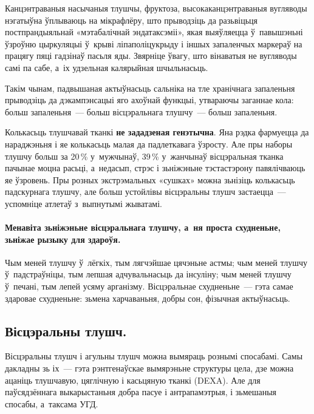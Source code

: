 
Канцэнтраваныя насычаныя тлушчы, фруктоза, высокаканцэнтраваныя вугляводы нэгатыўна ўплываюць на мікрафлёру, што прыводзіць да разьвіцьця постпрандыяльнай «мэтабалічнай эндатаксэміі», якая выяўляецца ў~павышэньні ўзроўню цыркуляцыі ў~крыві ліпаполіцукрыду і іншых запаленчых маркераў на працягу пяці гадзінаў пасьля яды. Звярніце ўвагу, што вінаватыя не вугляводы самі па сабе, а~іх удзельная калярыйная шчыльнасьць.

Такім чынам, падвышаная актыўнасьць сальніка на тле хранічнага запаленьня прыводзіць да дэкампэнсацыі яго ахоўнай функцыі, утвараючы заганнае кола: больш запаленьня~--- больш вісцэральнага тлушчу~--- больш запаленьня.

Колькасьць тлушчавай тканкі \textbf{не зададзеная генэтычна}. Яна рэдка фармуецца да нараджэньня і яе колькасьць малая да падлеткавага ўзросту. Але пры наборы тлушчу больш за 20\,\% у~мужчынаў, 39\,\% у~жанчынаў вісцэральная тканка пачынае моцна расьці, а~недасып, стрэс і зьніжэньне тэстастэрону павялічваюць яе ўзровень. Пры розных экстрэмальных «сушках» можна зьнізіць колькасьць падскурнага тлушчу, але больш устойлівы вісцэральны тлушч застаецца~--- успомніце атлетаў з~выпнутымі жыватамі.

\paragraph{Менавіта зьніжэньне вісцэральнага тлушчу, а~ня проста схудненьне, зьніжае рызыку для здароўя.} Чым меней тлушчу ў~лёгкіх, тым лягчэйшае цячэньне астмы; чым меней тлушчу ў~падстраўніцы, тым лепшая адчувальнасьць да інсуліну; чым меней тлушчу ў~печані, тым лепей усяму арганізму. Вісцэральнае схудненьне~--- гэта самае здаровае схудненьне: зьмена харчаваньня, добры сон, фізычная актыўнасьць.

\subsection*{Вісцэральны тлушч.}
Вісцэральны тлушч і агульны тлушч можна вымяраць рознымі спосабамі. Самы дакладны зь іх~--- гэта рэнтгенаўскае вымярэньне структуры цела, дзе можна ацаніць тлушчавую, цяглічную і касьцяную тканкі (DEXA). Але для паўсядзённага выкарыстаньня добра пасуе і антрапамэтрыя, і зьмешаныя спосабы, а~таксама УГД.

